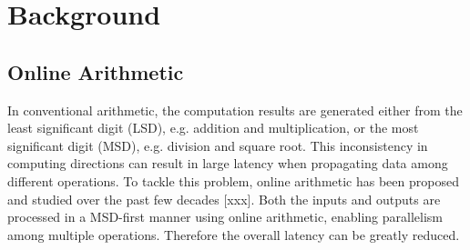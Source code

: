 \documentclass{acm_proc_article-sp}
\begin{document}








\section{Background}
\subsection{Online Arithmetic}
In conventional arithmetic, the computation results are generated either from the least significant digit (LSD), e.g. addition and multiplication, or the most significant digit (MSD), e.g. division and square root. This inconsistency in computing directions can result in large latency when propagating data among different operations. To tackle this problem, online arithmetic has been proposed and studied over the past few decades [xxx]. Both the inputs and outputs are processed in a MSD-first manner using online arithmetic, enabling parallelism among multiple operations. Therefore the overall latency can be greatly reduced.
\end{document}
